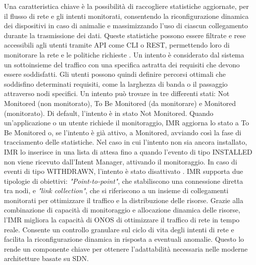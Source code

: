 \newline Una caratteristica chiave è la possibilità di raccogliere statistiche aggiornate, per il flusso di rete e gli intenti monitorati, 
consentendo la riconfigurazione dinamica dei dispositivi in caso di animalie e massimizzando l'uso di ciascun collegamento durante la trasmissione dei dati.
Queste statistiche possono essere filtrate e rese accessibili agli utenti tramite API come CLI o REST, permettendo loro di monitorare la rete e le politiche richieste \cite{ONOSart}. 
\newline Un intento è considerato dal sistema un sottoinsieme del traffico con una specifica astratta dei requisiti che devono essere soddisfatti.
Gli utenti possono quindi definire percorsi ottimali che soddisfino determinati requisiti, come la larghezza di banda o il passaggio attraverso nodi
specifici.
Un intento può trovare in tre differenti stati: Not Monitored (non monitorato), To Be Monitored (da monitorare) e Monitored (monitorato). 
Di default, l'intento è in stato Not Monitored. Quando un'applicazione o un utente richiede il monitoraggio, IMR aggiorna lo stato a To Be Monitored o, se l'intento è già attivo, a Monitored, avviando così la fase di tracciamento delle statistiche.
Nel caso in cui l'intento non sia ancora installato, IMR lo inserisce in una lista di attesa fino a quando l'evento di tipo INSTALLED non viene ricevuto dall'Intent Manager, attivando il monitoraggio.
In caso di eventi di tipo WITHDRAWN, l'intento è stato disattivato \cite{onosint}.
\newline IMR supporta due tipologie di obiettivi: \textit{"Point-to-point"}, che stabiliscono una connessione diretta tra nodi, e 
\textit{"link collection"}, che si riferiscono a un insieme di collegamenti monitorati per ottimizzare il traffico e la distribuzione delle risorse.
Grazie alla combinazione di capacità di monitoraggio e allocazione dinamica delle risorse, l'IMR migliora la capacità di ONOS di ottimizzare il traffico di rete in tempo reale. Consente un controllo 
granulare sul ciclo di vita degli intenti di rete e facilita la riconfigurazione dinamica in risposta a eventuali anomalie.
Questo lo rende un componente chiave per ottenere l'adattabilità necessaria nelle moderne architetture basate su SDN.

